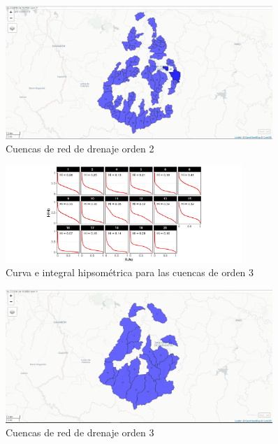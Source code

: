 \documentclass[11pt,]{article}
\begin{document}
\begin{figure}
\centering
\includegraphics[width=0.90000\textwidth]{Mapview_hypsobasinorder2.png}
\caption{Cuencas de red de drenaje orden 2\label{hypb2}}
\end{figure}

\begin{figure}
\centering
\includegraphics[width=0.80000\textwidth]{HypsoBasinOrder3.png}
\caption{Curva e integral hipsométrica para las cuencas de orden
3\label{hysob3}}
\end{figure}

\begin{figure}
\centering
\includegraphics[width=0.90000\textwidth]{Mapview_hypsobasinorder3.png}
\caption{Cuencas de red de drenaje orden 3\label{hypb3}}
\end{figure}
\end{document}
